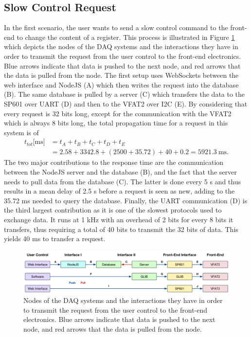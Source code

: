    \subsection{Slow Control Request}

      In the first scenario, the user wants to send a slow control command to the front-end to change the content of a register. This process is illustrated in Figure \ref{fig:III-2-ctrl-req} which depicts the nodes of the DAQ systems and the interactions they have in order to transmit the request from the user control to the front-end electronics. Blue arrows indicate that data is pushed to the next node, and red arrows that the data is pulled from the node. The first setup uses WebSockets between the web interface and NodeJS (A) which then writes the request into the database (B). The same database is pulled by a server (C) which transfers the data to the SP601 over UART (D) and then to the VFAT2 over I2C (E). By considering that every request is 32 bits long, except for the communication with the VFAT2 which is always 8 bits long, the total propagation time for a request in this system is of
      \begin{equation}
        \begin{split}
          t_{tot}\text{[ms]} & = t_A + t_B + t_C + t_D + t_E \\
                             & = 2.58 + 3342.8 + (2500 + 35.72) + 40 + 0.2 = 5921.3 \ \text{ms}.
        \end{split}
      \end{equation}
      The two major contributions to the response time are the communication between the NodeJS server and the database (B), and the fact that the server needs to pull data from the database (C). The latter is done every 5 s and thus results in a mean delay of 2.5 s before a request is seen as new, adding to the 35.72 ms needed to query the database. Finally, the UART communication (D) is the third largest contribution as it is one of the slowest protocols used to exchange data. It runs at 1 kHz with an overhead of 2 bits for every 8 bits it transfers, thus requiring a total of 40 bits to transmit the 32 bits of data. This yields 40 ms to transfer a request. \\

      \begin{figure}[t!]
        \centering
        \includegraphics[width=\textwidth]{img/III-2-web-daq/ctrl_req}
        \caption{Nodes of the DAQ systems and the interactions they have in order to transmit the request from the user control to the front-end electronics. Blue arrows indicate that data is pushed to the next node, and red arrows that the data is pulled from the node.}
        \label{fig:III-2-ctrl-req}
      \end{figure}

